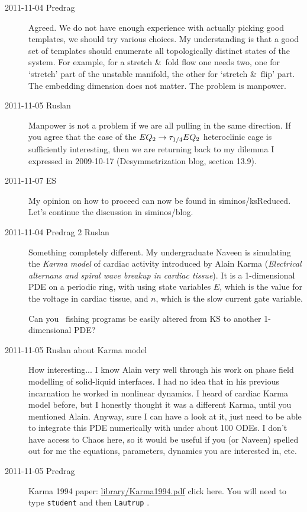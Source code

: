 \begin{description}
\item[2011-11-04 Predrag] Agreed. We do not have enough experience with
actually picking good templates, we should try various choices. My
understanding is that a good set of templates should enumerate all topologically
distinct states of the system. For example, for a stretch \&\ fold flow
one needs two, one for `stretch' part of the unstable manifold, the other
for `stretch \&\ flip' part. The embedding dimension does not matter.
The problem is manpower.

\item[2011-11-05 Ruslan] Manpower is not a problem if we are all pulling
in the same direction.  If you agree that the case of the
$EQ_{2} \to \tau_{1/4}EQ_{2}$ heteroclinic cage is sufficiently interesting,
then we are returning back to my dilemma
I expressed in 2009-10-17 (Desymmetrization blog, section 13.9).

\item[2011-11-07 ES] My opinion on how to proceed can now be found
in siminos/ksReduced. Let's continue the discussion in siminos/blog.

\item[2011-11-04 Predrag 2 Ruslan] Something completely different. My
undergraduate Naveen is simulating the \emph{Karma model} of cardiac
activity introduced by Alain Karma (\emph{Electrical alternans and spiral
wave breakup in cardiac tissue}). It is a 1-dimensional PDE on a
periodic ring, with using state variables $E$, which is the value for the
voltage in cardiac tissue, and $n$, which is the slow current gate
variable.

Can you \rpo\ fishing programs be easily altered from KS to another
1-dimensional PDE?

\item[2011-11-05 Ruslan about Karma model]  How interesting... I know
Alain very well through his work on phase field modelling of solid-liquid
interfaces.  I had no idea that in his previous incarnation he worked in
nonlinear dynamics.  I heard of cardiac Karma model before, but I
honestly thought it was a different Karma, until you mentioned Alain.
Anyway, sure I can have a look at it, just need to be able to integrate
this PDE numerically with under about 100 ODEs.  I don't have access to
Chaos here, so it would be useful if you (or Naveen) spelled out for me
the equations, parameters, dynamics you are interested in, etc.

\item[2011-11-05 Predrag] Karma 1994 paper:
\href{http://chaosbook.org/library/Karma1994.pdf}{library/Karma1994.pdf}
{click here}. You will need to type \texttt{student} and then \texttt{Lautrup} .


\end{description}
